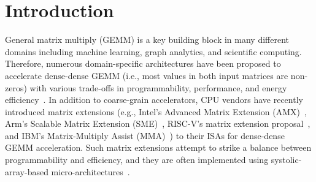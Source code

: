 
\section{Introduction}
\label{sec-spz-intro}


General matrix multiply (GEMM) is a key building block in many different
domains including machine learning, graph analytics, and scientific
computing. Therefore, numerous domain-specific architectures have been
proposed to accelerate dense-dense GEMM (i.e., most values in both input
matrices are non-zeros) with various trade-offs in programmability,
performance, and energy
efficiency~\cite{jouppi-datacenter-isca2017,teich-google-tpu-v2-blog2018,chen-eyeriss-v2-jetcas2019,jouppi-google-tpu-v2-v3-cacm2020,choquette-tensor-core-nvidia-ieeemicro2021}.
In addition to coarse-grain accelerators, CPU vendors have recently
introduced matrix extensions (e.g., Intel's Advanced Matrix Extension
(AMX)~\cite{intel-amx-web,nassif-intel-sapphire-isscc2022,jeong-rasa-dac2021},
Arm's Scalable Matrix Extension (SME)~\cite{arm-sme-web}, RISC-V's matrix
extension proposal~\cite{riscv-mtx-ext-proposal-web}, and IBM's
Matrix-Multiply Assist (MMA)~\cite{ibm-mmx-assist-web}) to their ISAs for
dense-dense GEMM acceleration. Such matrix extensions attempt to strike a
balance between programmability and efficiency, and they are often
implemented using systolic-array-based
micro-architectures~\cite{intel-amx-web,nassif-intel-sapphire-isscc2022}.


